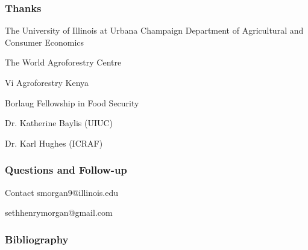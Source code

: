 \documentclass{beamer}
\begin{document}
\begin{frame}
\frametitle{Thanks}
\centering

The University of Illinois at Urbana Champaign Department of Agricultural and Consumer Economics
\medskip

The World Agroforestry Centre
\medskip

Vi Agroforestry Kenya
\medskip

Borlaug Fellowship in Food Security
\medskip

Dr. Katherine Baylis (UIUC)
\medskip

Dr. Karl Hughes (ICRAF)

\end{frame}


\begin{frame}
\frametitle{Questions and Follow-up}

\begin{block}{Contact}
smorgan9@illinois.edu

sethhenrymorgan@gmail.com
\end{block}

\end{frame}

\begin{frame}[shrink]
\frametitle{Bibliography}
 \printbibliography
\end{frame}
\end{document}
